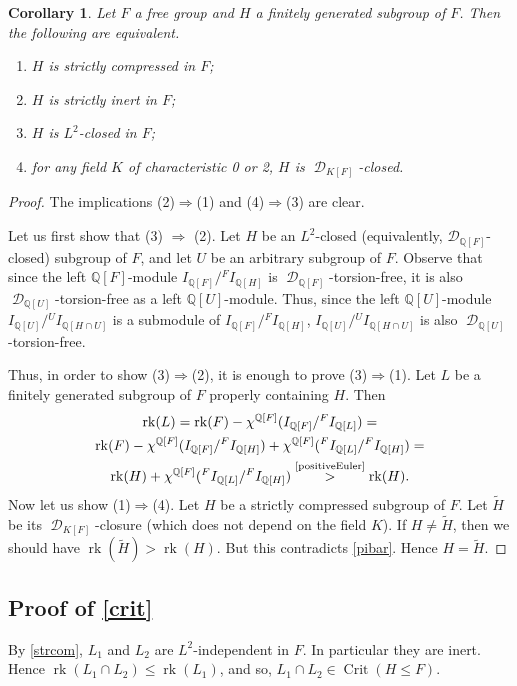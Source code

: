 \documentclass{amsart}
\newtheorem{cor}[lem]{Corollary}
\theoremstyle{definition}
\theoremstyle{remark}
\DeclareMathOperator{\D}{\mathcal D}
\DeclareMathOperator{\Crit}{Crit}
\DeclareMathOperator{\rk}{rk}
\newcommand{\myges}[1]{\ensuremath{\stackrel{\text{#1}}{>}}}
\newcommand{\Q}{\mathbb{Q}}
\begin{document}
\begin{cor}
Let $F$  a free group and $H$ a finitely generated subgroup of $F$. Then the following are equivalent.
\begin{enumerate}
\item $H$ is strictly compressed in $F$;
\item $H$ is strictly inert in $F$;
\item  $H$ is $L^2$-closed in $F$;
\item for any field $K$ of characteristic 0 or 2, $H$ is $\D_{K[F]}$-closed.
\end{enumerate}
\end{cor}
\begin{proof}
The implications (2)$\Rightarrow$(1) and (4)$\Rightarrow$(3)  are  clear. 

Let us first show that (3) $\Rightarrow$ (2).  
Let $H$ be an $L^2$-closed (equivalently, $\mathcal{D}_{\mathbb{Q}[F]}$-closed) subgroup of $F$, and let $U$ be an arbitrary subgroup of $F$.
Observe that since the left $\Q[F]$-module $I_{\Q[F]}/{}^F  I_{\Q[H]}$ is $\D_{\Q[F]}$-torsion-free, it is also $\D_{\Q[U]}$-torsion-free as a left $\Q[U]$-module.
Thus, since the left $\Q[U]$-module $I_{\Q[U]}/{}^UI_{\Q[H\cap U]}$ is a submodule of $I_{\Q[F]}/ {}^FI_{\Q[H]}$, $I_{\Q[U]}/{}^UI_{\Q[H\cap U]}$  is also $\D_{\Q[U]}$-torsion-free.

Thus, in order to show (3)$\Rightarrow$(2), it is enough to prove (3)$\Rightarrow$(1). Let $L$ be a finitely generated subgroup of $F$ properly containing $H$. Then
\begin{multline*}
\rk(L)=\rk(F) -\chi^{\Q[F]}(I_{\Q[F]}/{}^FI_{\Q[L]})
=\\
\rk(F) -\chi^{\Q[F]}(I_{\Q[F]}/{}^FI_{\Q[H]})+
\chi^{\Q[F]}({}^FI_{\Q[L]}/{}^FI_{\Q[H]})=\\
\rk(H)+\chi^{\Q[F]}({}^FI_{\Q[L]}/{}^FI_{\Q[H]})
\myges{\cref{positiveEuler}} \rk(H).
\end{multline*}
Now let us show (1)$\Rightarrow$(4). Let $H$ be a strictly compressed subgroup of $F$. Let $\widetilde H$ be its $\D_{K[F]}$-closure (which does not depend on the field $K$).  If  $H\ne \widetilde H$, then we should have $\rk(\widetilde H)>\rk (H)$. But this contradicts \cref{pibar}. Hence $H= \widetilde H$.
 \end{proof}


\subsection{Proof of \cref{crit}}
By  \cref{strcom}, $L_1$ and $L_2$ are $L^2$-independent in $F$. In particular they are inert. Hence $\rk(L_1\cap L_2)\le \rk (L_1)$, and so, $L_1\cap L_2\in \Crit(H\le F)$.
\end{document}
